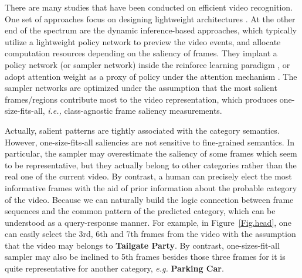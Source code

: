 \documentclass[runningheads]{llncs}
\newcommand{\figref}[1]{Figure~\ref{#1}}
\begin{document}
There are many studies that have been conducted on efficient video recognition.
One set of approaches focus on designing lightweight architectures \cite{r2plus1d,x3d}. 
At the other end of the spectrum are the dynamic inference-based approaches, which typically utilize a lightweight policy network to preview the video events, and allocate computation resources depending on the saliency of frames. 
They implant a policy network (or sampler network) inside the reinforce learning paradigm \cite{marl,adaframe,ada3d}, or adopt attention weight as a proxy of policy under the attention mechanism \cite{listentolook,smart2020}. The sampler networks are optimized under the assumption that the most salient frames/regions contribute most to  the video representation, which 
produces one-size-fits-all, \emph{i.e.,} class-agnostic frame saliency measurements. 


Actually, salient patterns are tightly associated with the category semantics. However, one-size-fits-all saliencies are not sensitive to fine-grained semantics. In particular, the sampler may overestimate the saliency of some frames which seem to be representative, but they actually belong to other categories rather than the real one of the current video. 
By contrast, a human can precisely elect the most informative frames with the aid of prior information about the probable category of the video. Because we can naturally build the logic connection between frame sequences and the common pattern of the predicted category, which can be understood as a query-response manner. For example, in \figref{Fig.head}, one can easily select the 3rd, 6th and 7th frames from the video with the assumption that the video may belongs to \textbf{Tailgate Party}. By contrast, one-sizes-fit-all sampler may also be inclined to 5th frames besides those three frames for it is quite representative for another category, \textit{e.g.} \textbf{Parking Car}.
\end{document}
